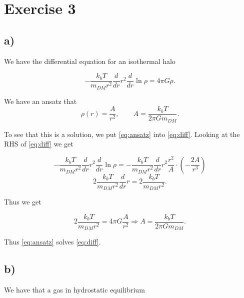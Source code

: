 \documentclass[a4paper,norsk, 10pt]{article}
\begin{document}
\section{Exercise 3}
\subsection{a)}
We have the differential equation for an isothermal halo

\begin{equation}\label{eq:diff}
-\dfrac{k_b T}{m_{DM} r^2}\dfrac{d}{dr}r^2 \dfrac{d}{dr} \ln \rho = 4 \pi G\rho.
\end{equation}

We have an ansatz that
\begin{equation}\label{eq:ansatz}
\rho(r) = \dfrac{A}{r^2}, \qquad A = \frac{k_b T}{2\pi Gm_{DM}}.
\end{equation}

To see that this is a solution, we put \eqref{eq:ansatz} into \eqref{eq:diff}. Looking at the RHS of \eqref{eq:diff} we get 


\begin{equation}
-\dfrac{k_b T}{m_{DM} r^2}\dfrac{d}{dr}r^2 \dfrac{d}{dr} \ln \rho = -\dfrac{k_b T}{m_{DM} r^2}\dfrac{d}{dr}r^2 \dfrac{r^2}{A}\cdot \left(-\dfrac{2A}{r^3}\right)
\end{equation}
\begin{equation}
2\dfrac{k_b T}{m_{DM} r^2}\dfrac{d}{dr}r = 2\dfrac{k_b T}{m_{DM} r^2}.
\end{equation}

Thus we get

\begin{equation}
2\dfrac{k_b T}{m_{DM} r^2} = 4\pi G \dfrac{A}{r^2} \Rightarrow A = \dfrac{k_b T}{2\pi G m_{DM} }.
\end{equation}

Thus \eqref{eq:ansatz} solves \eqref{eq:diff}.


\subsection{b)}

We have that a gas in hydrostatic equilibrium 
\end{document}
